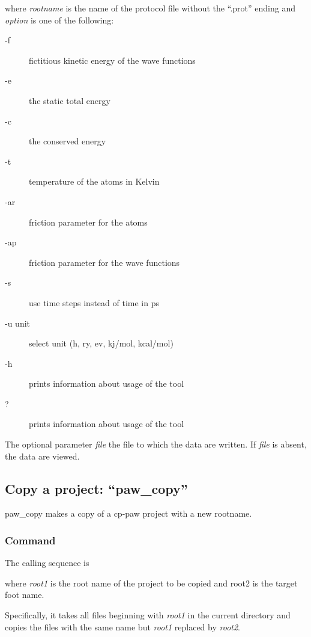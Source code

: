 \documentclass[final,12pt]{article}
\begin{document}
{{{{{{\bigskip{}\bigskip

\noindent where {\it rootname} is the name of the protocol file 
without the ``.prot'' ending and {\it option} is one of the following:
\begin{description}
\item[-f] fictitious kinetic energy of the wave functions
\item[-e] the static total energy
\item[-c] the conserved energy
\item[-t] temperature of the atoms in Kelvin
\item[-ar] friction parameter for the atoms
\item[-ap] friction parameter for the wave functions
\item[-s] use time steps instead of time in ps
\item[-u unit] select unit (h, ry, ev, kj/mol, kcal/mol)     
\item[-h] prints information about usage of the tool 
\item[?] prints information about usage of the tool 
\end{description}
The optional parameter {\it file} the file to which the data are
written. If {\it file} is absent, the data are viewed.


\subsection{Copy a project: ``paw\_copy''}
paw\_copy makes a copy of a cp-paw project with a new rootname.


\subsubsection{Command}
The calling sequence is

\bigskip{}\bigskip

\noindent where {\it root1} is the root name of the project to be
copied and root2 is the target foot name.

Specifically, it takes all files beginning with {\it root1} in the
current directory and copies the files with the same name but {\it
root1} replaced by {\it root2}.

}}}}}}
\end{document}
